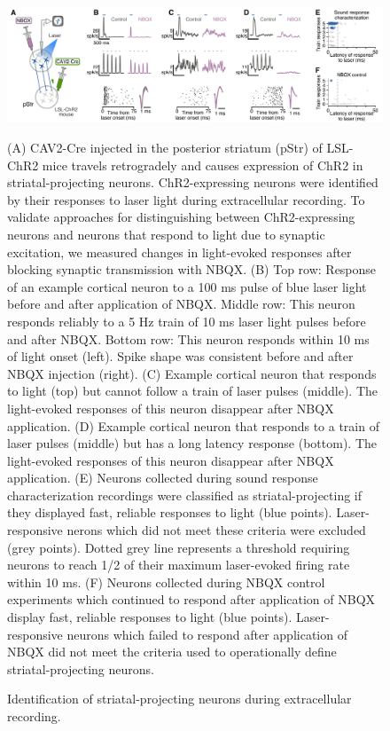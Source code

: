 \begin{figure}[hp]
  \begin{center}
    \includegraphics[width=6in]{figures/chapter3/fig2_method}%
  \end{center}
\caption{Identification of striatal-projecting neurons during extracellular recording.}{(A) CAV2-Cre injected in the posterior striatum (pStr) of LSL-ChR2 mice travels retrogradely and causes expression of ChR2 in striatal-projecting neurons.
%
ChR2-expressing neurons were identified by their responses to laser light during extracellular recording. 
%
To validate approaches for distinguishing between ChR2-expressing neurons and neurons that respond to light due to synaptic excitation, we measured changes in light-evoked responses after blocking synaptic transmission with NBQX.
%
(B) Top row: Response of an example cortical neuron to a 100 ms pulse of blue laser light before and after application of NBQX. Middle row: This neuron responds reliably to a 5 Hz train of 10 ms laser light pulses before and after NBQX. Bottom row: This neuron responds within 10 ms of light onset (left). Spike shape was consistent before and after NBQX injection (right). 
%
(C) Example cortical neuron that responds to light (top) but cannot follow a train of laser pulses (middle). The light-evoked responses of this neuron disappear after NBQX application. 
%
(D) Example cortical neuron that responds to a train of laser pulses (middle) but has a long latency response (bottom). 
%
The light-evoked responses of this neuron disappear after NBQX application. 
%
(E) Neurons collected during sound response characterization recordings were classified as striatal-projecting if they displayed fast, reliable responses to light (blue points). Laser-responsive nerons which did not meet these criteria were excluded (grey points).
Dotted grey line represents a threshold requiring neurons to reach 1/2 of their maximum laser-evoked firing rate within 10 ms.
%
(F) Neurons collected during NBQX control experiments which continued to respond after application of NBQX display fast, reliable responses to light (blue points). Laser-responsive neurons which failed to respond after application of NBQX did not meet the criteria used to operationally define striatal-projecting neurons. 
}
\end{figure}


